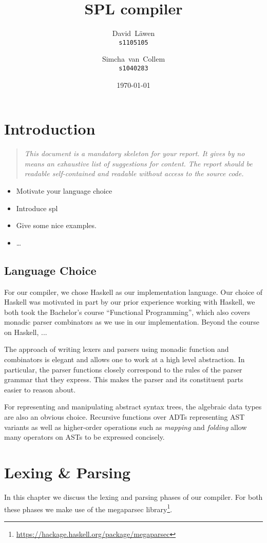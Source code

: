 \documentclass{report}
\author{%
	David~L\"awen\\
	\small\texttt{s1105105}\and
	Simcha~van~Collem\\
	\small\texttt{s1040283}
}
\date{\today}
\title{SPL compiler}
\begin{document}
\maketitle%

\tableofcontents%

\chapter{Introduction}
\begin{quote}
	\it
	This document is a mandatory skeleton for your report.
	It gives by no means an exhaustive list of suggestions for content.
	The report should be readable self-contained and readable without access to the source code.
\end{quote}
\begin{itemize}
	\item Motivate your language choice
	\item Introduce spl
	\item Give some nice examples.
	\item \ldots
\end{itemize}

\section{Language Choice}
For our compiler, we chose Haskell as our implementation language. Our choice
of Haskell was motivated in part by our prior experience working with Haskell,
we both took the Bachelor's course ``Functional Programming'', which also covers
monadic parser combinators as we use in our implementation.
Beyond the course on Haskell, ...

The approach of writing lexers and parsers using monadic function and
combinators is elegant and allows one to work at a high level abstraction.
In particular, the parser functions closely correspond to the rules of the
parser grammar that they express. This makes the parser and its constituent
parts easier to reason about.

For representing and manipulating abstract syntax trees, the algebraic data
types are also an obvious choice. Recursive functions over ADTs representing
AST variants as well as higher-order operations such as \emph{mapping} and
\emph{folding} allow many operators on ASTs to be expressed concisely.


\chapter{Lexing \& Parsing}
In this chapter we discuss the lexing and parsing phases of our compiler.
For both these phases we make use of the megaparsec library\footnote{\url{https://hackage.haskell.org/package/megaparsec}}.
\end{document}

